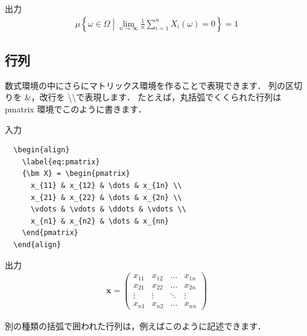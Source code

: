 \documentclass[11pt,a4j,onecolumn]{jsreport} %
\begin{document}
出力
\begin{align}
  \label{eq:the_strong_law_of_large_numbers}
  \mu \left\{
    \omega \in \Omega \middle| 
    \lim_{n \to \infty} \frac{1}{n} \sum_{i=1}^{n} X_i (\omega) = 0
  \right\} = 1
\end{align}

\subsection{行列}

数式環境の中にさらにマトリックス環境を作ることで表現できます．
列の区切りを \&，改行を \textbackslash \textbackslash で表現します．
たとえば，丸括弧でくくられた行列は pmatrix 環境でこのように書きます．

入力
\begin{verbatim}
  \begin{align}
    \label{eq:pmatrix}
    {\bm X} = \begin{pmatrix}
      x_{11} & x_{12} & \dots & x_{1n} \\
      x_{21} & x_{22} & \dots & x_{2n} \\
      \vdots & \vdots & \ddots & \vdots \\
      x_{n1} & x_{n2} & \dots & x_{nn} 
    \end{pmatrix}
  \end{align}
\end{verbatim}

出力
\begin{align}
  \label{eq:pmatrix}
  {\bm x} = \begin{pmatrix}
    x_{11} & x_{12} & \dots & x_{1n} \\
    x_{21} & x_{22} & \dots & x_{2n} \\
    \vdots & \vdots & \ddots & \vdots \\
    x_{n1} & x_{n2} & \dots & x_{nn} 
  \end{pmatrix}
\end{align}

別の種類の括弧で囲われた行列は，例えばこのように記述できます．
\end{document}
